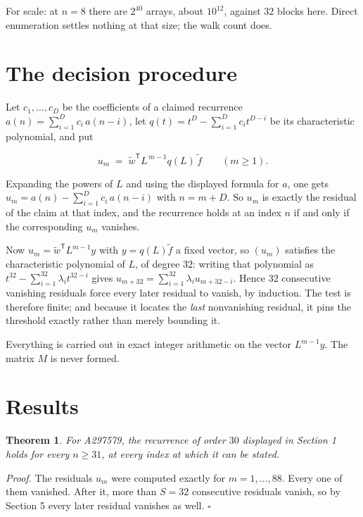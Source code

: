 \documentclass[11pt]{article}
\newtheorem{theorem}{Theorem}
\theoremstyle{definition}
\begin{document}
For scale: at $n = 8$ there are $2^{40}$ arrays, about $10^{12}$, against $32$ blocks here. Direct enumeration settles nothing at that size; the walk count does.

\section{The decision procedure}

Let $c_1,\dots,c_D$ be the coefficients of a claimed recurrence $a(n) = \sum_{i=1}^{D} c_i\,a(n-i)$, let $q(t) = t^{D} - \sum_{i=1}^{D} c_i t^{D-i}$ be its characteristic polynomial, and put

\[u_m \;=\; \tilde w^{\mathsf T} L^{\,m-1} q(L)\,\tilde f \qquad (m \ge 1).\]

Expanding the powers of $L$ and using the displayed formula for $a$, one gets $u_m = a(n) - \sum_{i=1}^{D} c_i\,a(n-i)$ with $n = m + D$. So $u_m$ is exactly the residual of the claim at that index, and the recurrence holds at an index $n$ if and only if the corresponding $u_m$ vanishes.

Now $u_m = \tilde w^{\mathsf T} L^{m-1} y$ with $y = q(L)\tilde f$ a fixed vector, so $(u_m)$ satisfies the characteristic polynomial of $L$, of degree $32$: writing that polynomial as $t^{32} - \sum_{i=1}^{32} \lambda_i t^{32-i}$ gives $u_{m+32} = \sum_{i=1}^{32} \lambda_i u_{m+32-i}$. Hence $32$ consecutive vanishing residuals force every later residual to vanish, by induction. The test is therefore finite; and because it locates the {\itshape last} nonvanishing residual, it pins the threshold exactly rather than merely bounding it.

Everything is carried out in exact integer arithmetic on the vector $L^{m-1}y$. The matrix $M$ is never formed.

\section{Results}

\begin{theorem} For A297579, the recurrence of order $30$ displayed in Section 1 holds for every $n \ge 31$, at every index at which it can be stated.\end{theorem}

{\itshape Proof.} The residuals $u_m$ were computed exactly for $m = 1,\dots,88$. Every one of them vanished. After it, more than $S = 32$ consecutive residuals vanish, so by Section 5 every later residual vanishes as well. $\square$
\end{document}
